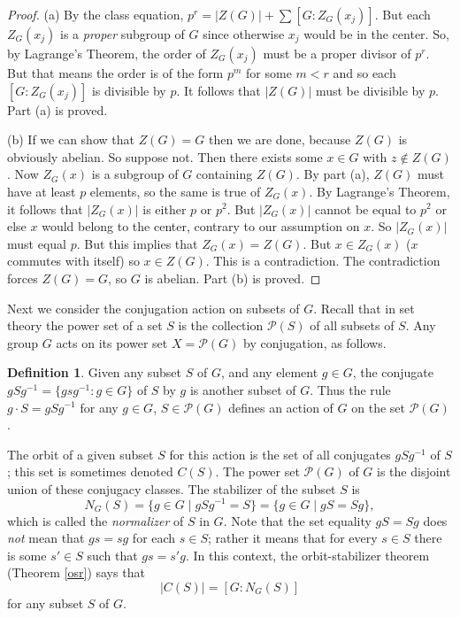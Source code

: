 \documentclass[11pt,oneside]{article}
\theoremstyle{definition}
\newtheorem{defn}[thm]{Definition}
\begin{document}
\begin{proof}
(a) By the class equation, $p^r = |Z(G)|+\sum [G:Z_G(x_j)]$. But each
  $Z_G(x_j)$ is a {\em proper} subgroup of $G$ since otherwise $x_j$
  would be in the center. So, by Lagrange's Theorem, the order of
  $Z_G(x_j)$ must be a proper divisor of $p^r$. But that means the
  order is of the form $p^m$ for some $m<r$ and so each $[G:Z_G(x_j)]$
  is divisible by $p$.  It follows that $|Z(G)|$ must be divisible by
  $p$. Part (a) is proved.

(b) If we can show that $Z(G) = G$ then we are done, because $Z(G)$ is
  obviously abelian. So suppose not. Then there exists some $x \in G$
  with $z \notin Z(G)$. Now $Z_G(x)$ is a subgroup of $G$ containing
  $Z(G)$. By part (a), $Z(G)$ must have at least $p$ elements, so the
  same is true of $Z_G(x)$. By Lagrange's Theorem, it follows that
  $|Z_G(x)|$ is either $p$ or $p^2$. But $|Z_G(x)|$ cannot be equal to
  $p^2$ or else $x$ would belong to the center, contrary to our
  assumption on $x$. So $|Z_G(x)|$ must equal $p$.  But this implies
  that $Z_G(x)=Z(G)$. But $x\in Z_G(x)$ ($x$ commutes with itself) so
  $x \in Z(G)$. This is a contradiction.  The contradiction forces
  $Z(G)=G$, so $G$ is abelian. Part (b) is proved.
\end{proof}


Next we consider the conjugation action on subsets of $G$.  Recall
that in set theory the power set of a set $S$ is the collection
$\mathcal{P}(S)$ of all subsets of $S$.  Any group $G$ acts on its
power set $X = \mathcal{P}(G)$ by conjugation, as follows.

\begin{defn}
Given any subset $S$ of $G$, and any element $g \in G$, the conjugate
$gSg^{-1} = \{gsg^{-1} \colon g \in G\}$ of $S$ by $g$ is another
subset of $G$. Thus the rule $g\cdot S = gSg^{-1}$ for any $g \in G$,
$S \in \mathcal{P}(G)$ defines an action of $G$ on the set
$\mathcal{P}(G)$.
\end{defn}

The orbit of a given subset $S$ for this action is the set of all
conjugates $gSg^{-1}$ of $S$; this set is sometimes denoted
$C(S)$. The power set $\mathcal{P}(G)$ of $G$ is the disjoint union of
these conjugacy classes. The stabilizer of the subset $S$ is 
\[
   N_G(S) = \{ g \in G \mid gSg^{-1} = S \} = \{ g\in G \mid gS = Sg \},
\]
which is called the {\em normalizer} of $S$ in
$G$. Note that the set equality $gS=Sg$ does \emph{not} mean that
$gs=sg$ for each $s \in S$; rather it means that for every $s\in S$
there is some $s'\in S$ such that $gs = s'g$.  In this context, the
orbit-stabilizer theorem (Theorem \ref{osr}) says that
\[
  |C(S)| = [G:N_G(S)]
\]
for any subset $S$ of $G$. 
\end{document}
